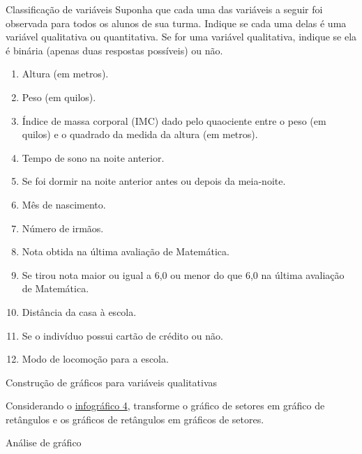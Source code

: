 {\begin{task}{ Classificação de variáveis}
Suponha que cada uma das variáveis a seguir foi observada para todos os alunos de sua turma. Indique se cada uma delas é uma variável qualitativa ou quantitativa. Se for uma variável qualitativa, indique se ela é binária (apenas duas respostas possíveis) ou não.
\begin{enumerate}
\item {} 
Altura (em metros).

\item {} 
Peso (em quilos).

\item {} 
Índice de massa corporal (IMC) dado pelo quaociente entre o peso (em quilos) e o quadrado da medida da altura (em metros).

\item {} 
Tempo de sono na noite anterior.

\item {} 
Se foi dormir na noite anterior antes ou depois da meia-noite.

\item {} 
Mês de nascimento.

\item {} 
Número de irmãos.

\item {} 
Nota obtida na última avaliação de Matemática.

\item {} 
Se tirou nota maior ou igual a 6,0 ou menor do que 6,0 na última avaliação de Matemática.

\item {} 
Distância da casa à escola.

\item {} 
Se o indivíduo possui cartão de crédito ou não.

\item {} 
Modo de locomoção para a escola.

\end{enumerate}
\end{task}
\label{est1-ativ-7}
\begin{task}{ Construção de gráficos para variáveis qualitativas}

Considerando o \hyperref[est1-fig-5]{infográfico 4}, transforme o gráfico de setores em gráfico de retângulos e os gráficos de retângulos em gráficos de setores.
\end{task}

\label{est1-ativ-8}
\begin{task}{ Análise de gráfico}


\end{task}}
